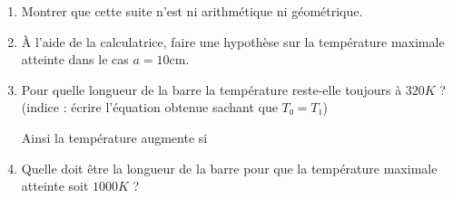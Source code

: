 \documentclass[
	classe=$1^{ere}STI2D$
]{exercice}
\begin{document}
\begin{exercice}
\begin{enumerate}
\begin{center}
		      \end{center}
		\item Montrer que cette suite n'est ni arithmétique ni géométrique.
		\item À l'aide de la calculatrice, faire une hypothèse sur la température maximale atteinte dans le cas $a = 10$cm. 
		\item Pour quelle longueur de la barre la température reste-elle toujours à $320K$ ? (indice : écrire l'équation obtenue sachant que $T₀ = T₁$)

		      Ainsi la température augmente si 
		\item Quelle doit être la longueur de la barre pour que la température maximale atteinte soit $1000K$ ?
	\end{enumerate}
\end{exercice}
\end{document}
